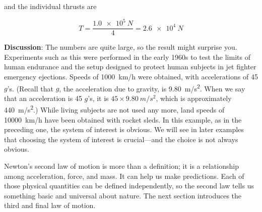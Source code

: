 \documentclass[main-ap-physics.tex]{subfiles}
\begin{document}
and the individual thrusts are

\begin{equation*}
    T = \frac{\SI{1.0e5}{N}}{4} = \SI{2.6e4}{N}
\end{equation*}

\textbf{Discussion}: The numbers are quite large, so the result might surprise you. Experiments such as this were performed in the early 1960s to test the limits of human endurance and the setup designed to protect human subjects in jet fighter emergency ejections. Speeds of \SI{1000}{km/h} were obtained, with accelerations of 45 $g$'s. (Recall that $g$, the acceleration due to gravity, is \SI{9.80}{m/s^2}. When we say that an acceleration is 45 $g$'s, it is  $45 \times \SI{9.80}{m/s^2}$, which is approximately  \SI{440}{m/s^2}.) While living subjects are not used any more, land speeds of \SI{10000}{km/h} have been obtained with rocket sleds. In this example, as in the preceding one, the system of interest is obvious. We will see in later examples that choosing the system of interest is crucial---and the choice is not always obvious.

\vspace{1em}

Newton's second law of motion is more than a definition; it is a relationship among acceleration, force, and mass. It can help us make predictions. Each of those physical quantities can be defined independently, so the second law tells us something basic and universal about nature. The next section introduces the third and final law of motion.

\endsolution   


 
\end{document}
